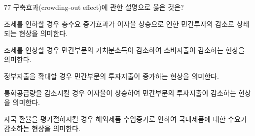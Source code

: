 \begin{question}{77}
구축효과(crowding-out effect)에 관한 설명으로 옳은 것은?
\begin{choices}
  \item 조세를 인하할 경우 총수요 증가효과가 이자율 상승으로 인한 민간투자의 감소로 상쇄되는 현상을 의미한다.
  \item 조세를 인상할 경우 민간부문의 가처분소득이 감소하여 소비지출이 감소하는 현상을 의미한다.
  \item 정부지출을 확대할 경우 민간부문의 투자지출이 증가하는 현상을 의미한다.
  \item 통화공급량을 감소시킬 경우 이자율이 상승하여 민간부문의 투자지출이 감소하는 현상을 의미한다.
  \item 자국 환율을 평가절하시킬 경우 해외제품 수입증가로 인하여 국내제품에 대한 수요가 감소하는 현상을 의미한다.
\end{choices}
\end{question}
